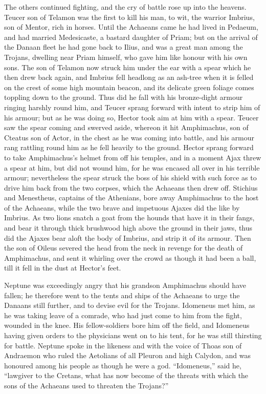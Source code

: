 The others continued fighting, and the cry of battle rose up into the
heavens. Teucer son of Telamon was the first to kill his man, to wit, the
warrior Imbrius, son of Mentor, rich in horses. Until the Achaeans came he
had lived in Pedaeum, and had married Medesicaste, a bastard daughter of
Priam; but on the arrival of the Danaan fleet he had gone back to Ilius,
and was a great man among the Trojans, dwelling near Priam himself, who
gave him like honour with his own sons. The son of Telamon now struck him
under the ear with a spear which he then drew back again, and Imbrius fell
headlong as an ash-tree when it is felled on the crest of some high
mountain beacon, and its delicate green foliage comes toppling down to the
ground. Thus did he fall with his bronze-dight armour ringing harshly
round him, and Teucer sprang forward with intent to strip him of his
armour; but as he was doing so, Hector took aim at him with a spear.
Teucer saw the spear coming and swerved aside, whereon it hit Amphimachus,
son of Cteatus son of Actor, in the chest as he was coming into battle,
and his armour rang rattling round him as he fell heavily to the ground.
Hector sprang forward to take Amphimachus’s helmet from off his temples,
and in a moment Ajax threw a spear at him, but did not wound him, for he
was encased all over in his terrible armour; nevertheless the spear struck
the boss of his shield with such force as to drive him back from the two
corpses, which the Achaeans then drew off. Stichius and Menestheus,
captains of the Athenians, bore away Amphimachus to the host of the
Achaeans, while the two brave and impetuous Ajaxes did the like by
Imbrius. As two lions snatch a goat from the hounds that have it in their
fangs, and bear it through thick brushwood high above the ground in their
jaws, thus did the Ajaxes bear aloft the body of Imbrius, and strip it of
its armour. Then the son of Oileus severed the head from the neck in
revenge for the death of Amphimachus, and sent it whirling over the crowd
as though it had been a ball, till it fell in the dust at Hector’s feet.

Neptune was exceedingly angry that his grandson Amphimachus should have
fallen; he therefore went to the tents and ships of the Achaeans to urge
the Danaans still further, and to devise evil for the Trojans. Idomeneus
met him, as he was taking leave of a comrade, who had just come to him
from the fight, wounded in the knee. His fellow-soldiers bore him off the
field, and Idomeneus having given orders to the physicians went on to his
tent, for he was still thirsting for battle. Neptune spoke in the likeness
and with the voice of Thoas son of Andraemon who ruled the Aetolians of
all Pleuron and high Calydon, and was honoured among his people as though
he were a god. “Idomeneus,” said he, “lawgiver to the Cretans, what has
now become of the threats with which the sons of the Achaeans used to
threaten the Trojans?”

